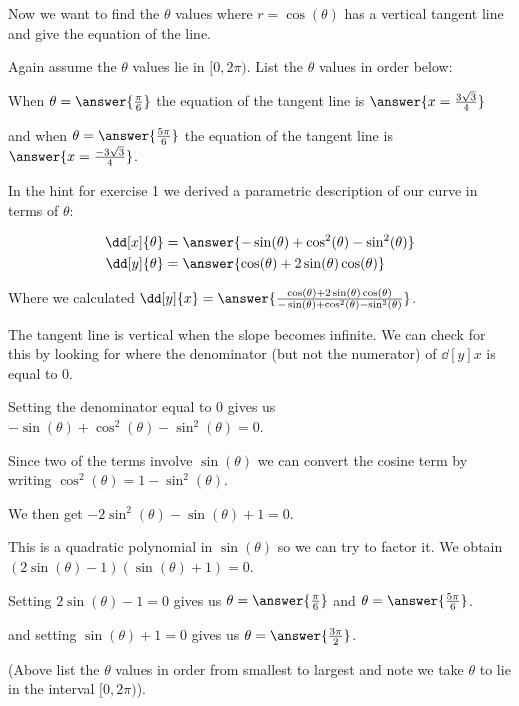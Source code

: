 \documentclass{ximera}
\begin{document}
\begin{exercise}
\begin{hint}
\end{hint}

\begin{exercise}



Now we want to find the $\theta$ values where $r=\cos(\theta)$ has a vertical tangent line and give the equation of the line. 

Again assume the $\theta$ values lie in $[0, 2\pi)$. List the $\theta$ values in order below: 

When $\theta=\answer{\frac{\pi}{6}}$ the equation of the tangent line is $\answer{x=\frac{3\sqrt{3}}{4} }$ 

and when $\theta=\answer{ \frac{5\pi}{6}}$ the equation of the tangent line is $\answer{x=\frac{-3\sqrt{3}}{4}}$. 





\begin{hint}


In the hint for exercise 1 we derived a parametric description of our curve in terms of $\theta$: 

\begin{align*}
\dd[x]{\theta}&=\answer{  -\sin(\theta)+\cos^2(\theta)-\sin^2(\theta) } \\
\dd[y]{\theta}&=\answer{ \cos(\theta) + 2\sin(\theta)\cos(\theta)    }
\end{align*} 

Where we calculated $\dd[y]{x}=\answer{ \frac{ \cos(\theta) + 2\sin(\theta)\cos(\theta) }{-\sin(\theta)+\cos^2(\theta)-\sin^2(\theta) }}$. 

The tangent line is vertical when the slope becomes infinite. We can check for this by looking for where the denominator (but not the numerator) of $\dd[y]{x}$ is equal to $0$.

Setting the denominator equal to $0$ gives us $ -\sin(\theta)+\cos^2(\theta)-\sin^2(\theta)=0$.  

Since two of the terms involve $\sin(\theta)$ we can convert the cosine term by writing $\cos^2(\theta)=1-\sin^2(\theta)$. 

We then get $-2\sin^2(\theta)-\sin(\theta)+1=0$. 

This is a quadratic polynomial in $\sin(\theta)$ so we can try to factor it. We obtain $(2\sin(\theta)-1)(\sin(\theta)+1)=0$. 


Setting $2\sin(\theta)-1=0$ gives us $\theta=\answer{ \frac{\pi}{6}}$ and $\theta=\answer{\frac{5\pi}{6}}$. 


and setting $\sin(\theta)+1=0$ gives us $\theta=\answer{ \frac{3\pi}{2}}$. 

(Above list the $\theta$ values in order from smallest to largest and note we take $\theta$ to lie in the interval $[0, 2\pi)$).


\end{hint}

\end{exercise}
\end{exercise}
\end{document}
